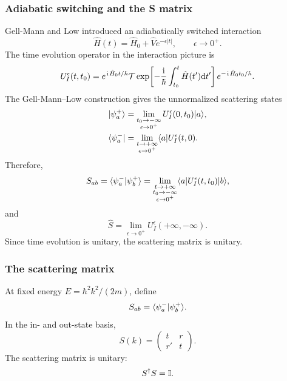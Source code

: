 \subsubsection{Adiabatic switching and the S matrix}\label{sec:gellmann-low}
Gell-Mann and Low introduced an adiabatically switched interaction
\begin{equation}
 \hat H(t)=\hat H_0+\hat V e^{-\epsilon|t|},
 \qquad \epsilon\to0^+.
\end{equation}
The time evolution operator in the interaction picture is
\begin{equation}
 U_I^\epsilon(t,t_0)
 =e^{\hspace{1pt}\mathrm{i}\hspace{1pt}\hat H_0t/\hbar}
 \mathcal T\exp\!\left[-\frac{\hspace{1pt}\mathrm{i}\hspace{1pt}}{\hbar}
 \int_{t_0}^{t}\hat H(t')\mathrm{d} t'\right]
 e^{-\hspace{1pt}\mathrm{i}\hspace{1pt}\hat H_0t_0/\hbar}.
\end{equation}
The Gell-Mann--Low construction gives the unnormalized scattering states
\begin{align}
 |{\psi_a^+}\rangle&=\lim_{\substack{t_0\to-\infty\\ \epsilon\to0^+}}
 U_I^\epsilon(0,t_0)|{a}\rangle,\\
 \langle{\psi_a^-}|&=\lim_{\substack{t\to+\infty\\ \epsilon\to0^+}}
 \langle{a}|U_I^\epsilon(t,0).
\end{align}
Therefore,
\begin{equation}
 S_{ab}=\langle{\psi_a^-|\psi_b^+}\rangle
 =\lim_{\substack{t\to+\infty\\t_0\to-\infty\\ \epsilon\to0^+}}
 \langle{a}|U_I^\epsilon(t,t_0)|{b}\rangle,
\end{equation}
and
\begin{equation}
 \hat S=\lim_{\epsilon\rightarrow0^+}U^\epsilon_I(+\infty,-\infty).
\end{equation}
Since time evolution is unitary, the scattering matrix is unitary.



\subsubsection{The scattering matrix}
At fixed energy $E=\hbar^2k^2/(2m)$, define
\begin{equation}
 S_{ab}=\langle{\psi_a^-|\psi_b^+}\rangle.
\end{equation}
In the in- and out-state basis,
\begin{equation}
 \boxed{
 S(k)=\begin{pmatrix}t&r\\r'&t\end{pmatrix}.}
\end{equation}
The scattering matrix is unitary:
\begin{equation}
 S^\dagger S=\mathbb{I}.
\end{equation}

